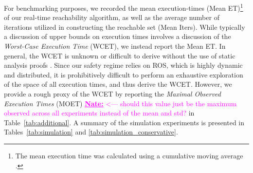 \documentclass[manuscript,screen,review]{acmart}
\newcommand{\nate}[1]{\textcolor{magenta}{\textbf{\underline{Nate:}} #1}}
\begin{document}
For benchmarking purposes, we recorded the mean execution-times (Mean ET)\footnote{The mean execution time was calculated using a cumulative moving average \cite{Jin2019}.} of our real-time reachability algorithm, as well as the average number of iterations utilized in constructing the reachable set (Mean Iters). While typically a discussion of upper bounds on execution times involves a discussion of the \emph{Worst-Case Execution Time} (WCET), we instead report the Mean ET. In general, the WCET is unknown or difficult to derive without the use of static analysis proofs \cite{Reinhard2008}. Since our safety regime relies on ROS, which is highly dynamic and distributed, it is prohibitively difficult to perform an exhaustive exploration of the space of all execution times, and thus derive the WCET.  However, we provide a rough proxy of the WCET by reporting the \emph{Maximal Observed Execution Times} (MOET) \nate{<--- should this value just be the maximum observed across all experiments instead of the mean and std?}  \cite{Reinhard2008} in Table~\ref{tab:additional}. %
A summary of the simulation experiments is presented in Tables~\ref{tab:simulation} and \ref{tab:simulation_conservative}.
\end{document}
